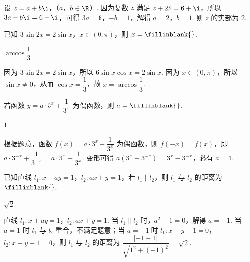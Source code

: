 \begin{solution}
设 \(z=a+b\i\)，（\(a\)，\(b\in\R\)）. 因为复数 \(z\) 满足 \(z+2\bar z=6+\i\)，所以 \(3a-b\i=6+\i\)，可得 \(3a=6\)，\(-b=1\)，解得 \(a=2\)，\(b=1\). 则 \(z\) 的实部为 \(2\).
\end{solution}

\begin{problem}
已知 \(3\sin 2x=2\sin x\)，\(x\in(0,\pi)\)，则 \(x=\fillinblank{}\).
\end{problem}

\begin{answer}
\(\arccos\dfrac{1}{3}\)
\end{answer}

\begin{solution}
因为 \(3\sin 2x=2\sin x\)，所以 \(6\sin x\cos x=2\sin x\). 因为 \(x\in(0,\pi)\)，所以 \(\sin x\ne0\)，从而 \(\cos x=\dfrac{1}{3}\)，故 \(x=\arccos\dfrac{1}{3}\).
\end{solution}

\begin{problem}
若函数 \(y=a\cdot3^x+\dfrac{1}{3^x}\) 为偶函数，则 \(a=\fillinblank{}\).
\end{problem}

\begin{answer}
\(1\)
\end{answer}

\begin{solution}
根据题意，函数 \(f(x)=a\cdot3^x+\dfrac{1}{3^x}\) 为偶函数，则 \(f(-x)=f(x)\)，即 \(a\cdot3^{-x}+\dfrac{1}{3^{-x}}=a\cdot3^x+\dfrac{1}{3^x}\). 变形可得 \(a(3^x-3^{-x})=3^x-3^{-x}\)，必有 \(a=1\).
\end{solution}

\begin{problem}
已知直线 \(l_1:x+ay=1\)，\(l_2:ax+y=1\)，若 \(l_1\parallel l_2\)，则 \(l_1\) 与 \(l_2\) 的距离为 \(\fillinblank{}\).
\end{problem}

\begin{answer}
\(\sqrt{2}\)
\end{answer}

\begin{solution}
直线 \(l_1:x+ay=1\)，\(l_2:ax+y=1\). 当 \(l_1\parallel l_2\) 时，\(a^2-1=0\)，解得 \(a=\pm1\). 当 \(a=1\) 时 \(l_1\) 与 \(l_2\) 重合，不满足题意；当 \(a=-1\) 时 \(l_1:x-y-1=0\)，\(l_2:x-y+1=0\)，则 \(l_1\) 与 \(l_2\) 的距离为 \(\dfrac{|-1-1|}{\sqrt{1^2+(-1)^2}}=\sqrt{2}\).
\end{solution}

